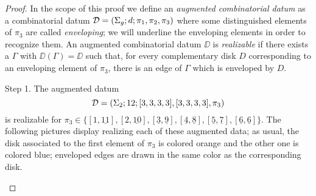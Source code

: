 \begin{proof}
\def\env#1{\underline{#1}}
In the scope of this proof we define an \emph{augmented combinatorial datum} as a combinatorial datum $\mathcal{D}=(\Sigma_{g};d;\pi_1,\pi_2,\pi_3)$ where some distinguished elements of $\pi_3$ are called \emph{enveloping}; we will underline the enveloping elements in order to recognize them. An augmented combinatorial datum $\DD$ is \emph{realizable} if there exists a \dessin{} $\Gamma$ with $\DD(\Gamma)=\DD$ such that, for every complementary disk $D$ corresponding to an enveloping element of $\pi_3$, there is an edge of $\Gamma$ which is enveloped by $D$.
\begin{sideline}{Step 1.}
The augmented datum
\[
\mathcal{D}=(\Sigma_{2};12;[3,3,3,3],[3,3,3,3],\pi_3)
\]
is realizable for $\pi_3\in\{[1,\env{11}],[2,\env{10}],[\env{3},\env{9}],[\env{4},\env{8}],[\env{5},\env{7}],[\env{6},\env{6}]\}$. The following pictures display \dessins{} realizing each of these augmented data; as usual, the disk associated to the first element of $\pi_3$ is colored orange and the other one is colored blue; enveloped edges are drawn in the same color as the corresponding disk.

\bgroup


\end{sideline}
\end{proof}
